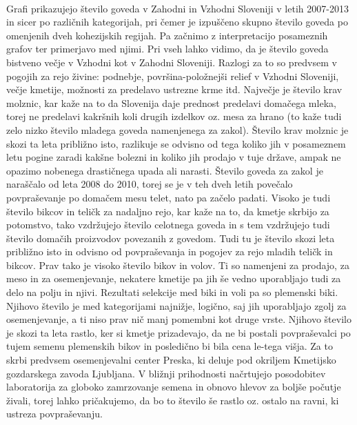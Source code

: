 \documentclass[11pt,a4paper]{article}
\begin{document}
\begin{center}
\\
\end{center}
Grafi prikazujejo število goveda v Zahodni in Vzhodni Sloveniji v letih 2007-2013 in sicer po različnih kategorijah, pri čemer je izpuščeno skupno število goveda po omenjenih dveh kohezijskih regijah. Pa začnimo z interpretacijo posameznih grafov ter primerjavo med njimi. Pri vseh lahko vidimo, da je število goveda bistveno večje v Vzhodni kot v Zahodni Sloveniji. Razlogi za to so predvsem v pogojih za rejo živine: podnebje, površina-položnejši relief v Vzhodni Sloveniji, večje kmetije, možnosti za predelavo ustrezne krme itd.
\newline
Največje je število krav molznic, kar kaže na to da Slovenija daje prednost predelavi domačega mleka, torej ne predelavi kakršnih koli drugih izdelkov oz. mesa za hrano (to kaže tudi zelo nizko število mladega goveda namenjenega za zakol). Število krav molznic je skozi ta leta približno isto, razlikuje se odvisno od tega koliko jih v posameznem letu pogine zaradi kakšne bolezni in koliko jih prodajo v tuje države, ampak ne opazimo nobenega drastičnega upada ali narasti. Število goveda za zakol je naraščalo od leta 2008 do 2010, torej se je v teh dveh letih povečalo povpraševanje po domačem mesu telet, nato pa začelo padati.
\newline
Visoko je tudi število bikcov in teličk za nadaljno rejo, kar kaže na to, da kmetje skrbijo za potomstvo, tako vzdržujejo število celotnega goveda in s tem vzdržujejo tudi število domačih proizvodov povezanih z govedom. Tudi tu je število skozi leta približno isto in odvisno od povpraševanja in pogojev za rejo mladih teličk in bikcov.
\newline
Prav tako je visoko število bikov in volov. Ti so namenjeni za prodajo, za meso in za osemenjevanje, nekatere kmetije pa jih še vedno uporabljajo tudi za delo na polju in njivi. 
\newline
Rezultati selekcije med biki in voli pa so plemenski biki. Njihovo število je med kategorijami najnižje, logično, saj jih uporabljajo zgolj za osemenjevanje, a ti niso prav nič manj pomembni kot druge vrste. Njihovo število je skozi ta leta rastlo, ker si kmetje prizadevajo, da ne bi postali povpraševalci po tujem semenu plemenskih bikov in posledično bi bila cena le-tega višja. Za to skrbi predvsem osemenjevalni center Preska, ki deluje pod okriljem Kmetijsko gozdarskega zavoda Ljubljana. V bližnji prihodnosti načrtujejo posodobitev laboratorija za globoko zamrzovanje semena in obnovo hlevov za boljše počutje živali, torej lahko pričakujemo, da bo to število še rastlo oz. ostalo na ravni, ki ustreza povpraševanju.
\end{document}
